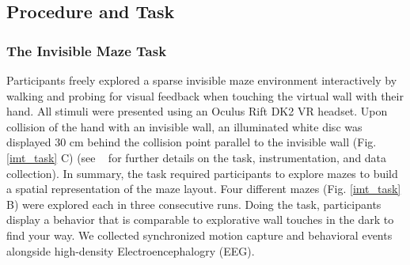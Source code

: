\subsection{Procedure and Task}
\subsubsection{The Invisible Maze Task} Participants freely explored a sparse invisible maze environment interactively by walking and probing for visual feedback when touching the virtual wall with their hand. All stimuli were presented using an Oculus Rift DK2 VR headset. Upon collision of the hand with an invisible wall, an illuminated white disc was displayed 30 cm behind the collision point parallel to the invisible wall (Fig. \ref{imt_task} C) (see ~\cite{Gehrke2018} for further details on the task, instrumentation, and data collection). In summary, the task required participants to explore mazes to build a spatial representation of the maze layout. Four different mazes (Fig. \ref{imt_task} B) were explored each in three consecutive runs. Doing the task, participants display a behavior that is comparable to explorative wall touches in the dark to find your way. We collected synchronized motion capture and behavioral events alongside high-density Electroencephalogry (EEG).